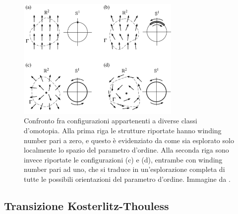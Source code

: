 \begin{figure}[H]
    \centering
    \includegraphics[width=0.7\textwidth]{Immagini/homCl_XY.png}
    \caption{Confronto fra configurazioni appartenenti a diverse classi d'omotopia. Alla prima riga le strutture riportate hanno winding 
    number pari a zero, e questo è evidenziato da come sia esplorato solo localmente lo spazio del parametro d'ordine. Alla seconda riga sono 
    invece riportate le configurazioni (c) e (d), entrambe con winding number pari ad uno, che si traduce in un'esplorazione completa di tutte le 
    possibili orientazioni del parametro d'ordine. Immagine da \cite{galliFSA}.}
    \label{fig: homCl_XY}
\end{figure}


\subsection{Transizione Kosterlitz-Thouless}
